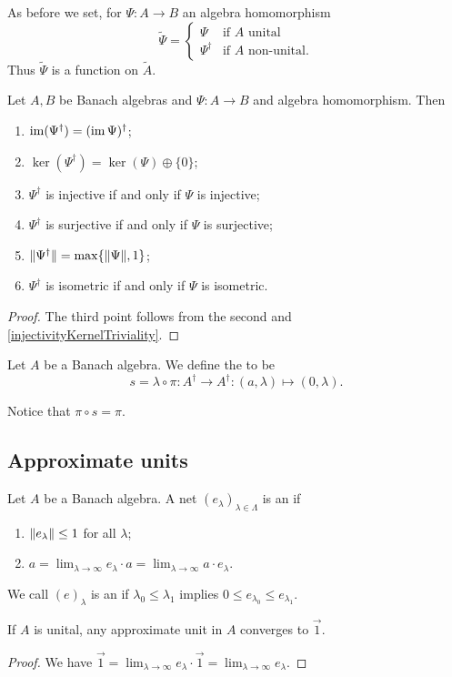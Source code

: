 \begin{definition}
As before we set, for $\Psi: A \to B$ an algebra homomorphism
\[ \tilde{\Psi} = \begin{cases}
\Psi & \text{if $A$ unital} \\
\Psi^\dagger & \text{if $A$ non-unital.}
\end{cases} \]
Thus $\tilde{\Psi}$ is a function on $\tilde{A}$.
\end{definition}

\begin{lemma} \label{DaggerMorphismProperties}
Let $A,B$ be Banach algebras and $\Psi:A\to B$ and algebra homomorphism. Then
\begin{enumerate}
\item $\operatorname{im}(\Psi^\dagger) = (\operatorname{im}\Psi)^\dagger$;
\item $\ker(\Psi^\dagger) = \ker(\Psi)\oplus\{0\}$;
\item $\Psi^\dagger$ is injective \textup{if and only if} $\Psi$ is injective;
\item $\Psi^\dagger$ is surjective \textup{if and only if} $\Psi$ is surjective;
\item $\lVert\Psi^\dagger\rVert = \max\{\lVert\Psi\rVert,1\}$;
\item $\Psi^\dagger$ is isometric \textup{if and only if} $\Psi$ is isometric.
\end{enumerate}
\end{lemma}
\begin{proof}
The third point follows from the second and \ref{injectivityKernelTriviality}.
\end{proof}

\begin{definition}
Let $A$ be a Banach algebra. We define the  to be
\[ s = \lambda\circ \pi: A^\dagger \to A^\dagger: (a,\lambda) \mapsto (0,\lambda). \]
\end{definition}
Notice that $\pi\circ s = \pi$.

\subsection{Approximate units}
\begin{definition}
Let $A$ be a Banach algebra. A net $(e_\lambda)_{\lambda\in\Lambda}$ is an  if
\begin{enumerate}
\item $\lVert e_\lambda\rVert\leq 1$ for all $\lambda$;
\item $a = \lim_{\lambda\to \infty} e_\lambda \cdot a = \lim_{\lambda\to \infty} a \cdot e_\lambda$.
\end{enumerate}
We call $(e)_\lambda$ is an  if $\lambda_0 \leq \lambda_1$ implies $0\leq e_{\lambda_0} \leq e_{\lambda_1}$.
\end{definition}
\begin{lemma}
If $A$ is unital, any approximate unit in $A$ converges to $\vec{1}$.
\end{lemma}
\begin{proof}
We have $\vec{1} = \lim_{\lambda\to\infty}e_\lambda\cdot \vec{1} = \lim_{\lambda\to\infty}e_\lambda$.
\end{proof}


